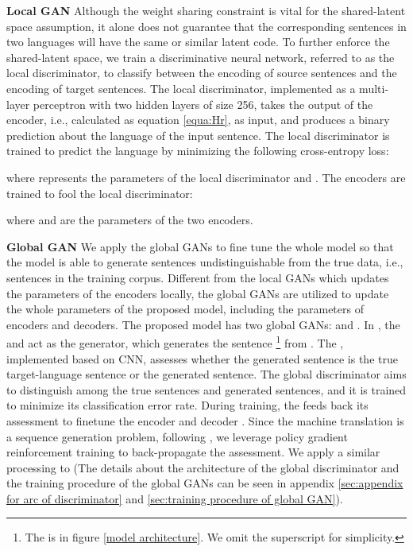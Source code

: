 \documentclass[11pt,a4paper]{article}
\begin{document}
\textbf{Local GAN} Although the weight sharing constraint is vital for the shared-latent space assumption, it alone does not guarantee that the corresponding sentences in two languages will have the same or similar latent code. To further enforce the shared-latent space, we train a discriminative neural network, referred to as the local discriminator, to classify between the encoding of source sentences and the encoding of target sentences. The local discriminator, implemented as a multi-layer perceptron with two hidden layers of size 256, takes the output of the encoder, i.e.,  calculated as equation \ref{equa:Hr}, as input, and produces a binary prediction about the language of the input sentence. The local discriminator is trained to predict the language by minimizing the following cross-entropy loss:

where  represents the parameters of the local discriminator and . The encoders are trained to fool the local discriminator:



where  and  are the parameters of the two encoders.

\textbf{Global GAN} We apply the global GANs to fine tune the whole model so that the model is able to generate sentences undistinguishable from the true data, i.e., sentences in the training corpus. Different from the local GANs which updates the parameters of the encoders locally, the global GANs are utilized to update the whole parameters of the proposed model, including the parameters of encoders and decoders. The proposed model has two global GANs:  and . In , the  and  act as the generator, which generates the sentence  \footnote{The  is  in figure \ref{model architecture}. We omit the superscript for simplicity.} from . The , implemented based on CNN, assesses whether the generated sentence  is the true target-language sentence or the generated sentence. The global discriminator aims to distinguish among the true sentences and generated sentences, and it is trained to minimize its classification error rate. During training, the  feeds back its assessment to finetune the encoder  and decoder . Since the machine translation is a sequence generation problem, following \cite{Yang2017Improving}, we leverage policy gradient reinforcement training to back-propagate the assessment. We apply a similar processing to  (The details about the architecture of the global discriminator and the training procedure of the global GANs can be seen in appendix \ref{sec:appendix for arc of discriminator} and \ref{sec:training procedure of global GAN}).
\end{document}
